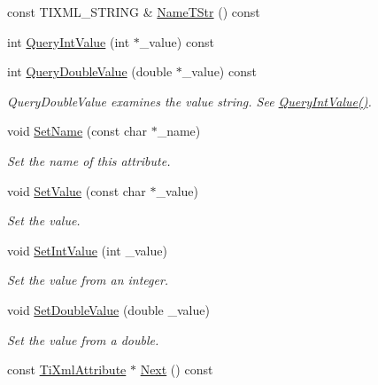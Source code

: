 \begin{DoxyCompactItemize}
const TIXML\_\-STRING \& \hyperlink{class_ti_xml_attribute_a64cee17bceb8232eb0736d26dd082d79}{NameTStr} () const 
\item 
int \hyperlink{class_ti_xml_attribute_ad6c93088ee21af41a107931223339344}{QueryIntValue} (int $\ast$\_\-value) const 
\item 
int \hyperlink{class_ti_xml_attribute_ac87b2a8489906a5d7aa2875f20be3513}{QueryDoubleValue} (double $\ast$\_\-value) const 
\begin{DoxyCompactList}\small\item\em QueryDoubleValue examines the value string. See \hyperlink{class_ti_xml_attribute_ad6c93088ee21af41a107931223339344}{QueryIntValue()}. \item\end{DoxyCompactList}\item 
void \hyperlink{class_ti_xml_attribute_ab7fa3d21ff8d7c5764cf9af15b667a99}{SetName} (const char $\ast$\_\-name)
\begin{DoxyCompactList}\small\item\em Set the name of this attribute. \item\end{DoxyCompactList}\item 
void \hyperlink{class_ti_xml_attribute_a2dae44178f668b3cb48101be4f2236a0}{SetValue} (const char $\ast$\_\-value)
\begin{DoxyCompactList}\small\item\em Set the value. \item\end{DoxyCompactList}\item 
void \hyperlink{class_ti_xml_attribute_a7e065df640116a62ea4f4b7da5449cc8}{SetIntValue} (int \_\-value)
\begin{DoxyCompactList}\small\item\em Set the value from an integer. \item\end{DoxyCompactList}\item 
void \hyperlink{class_ti_xml_attribute_a0316da31373496c4368ad549bf711394}{SetDoubleValue} (double \_\-value)
\begin{DoxyCompactList}\small\item\em Set the value from a double. \item\end{DoxyCompactList}\item 
const \hyperlink{class_ti_xml_attribute}{TiXmlAttribute} $\ast$ \hyperlink{class_ti_xml_attribute_a776478980776a024f7c2846eec640f65}{Next} () const 

\end{DoxyCompactItemize}
